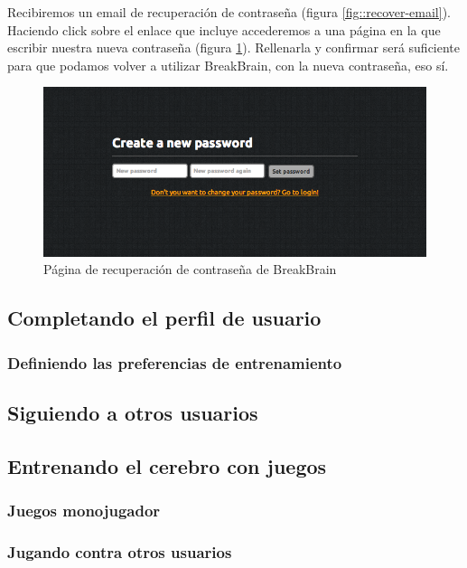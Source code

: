Recibiremos un email de recuperación de contraseña (figura \ref{fig::recover-email}). Haciendo click sobre el enlace que incluye accederemos a una página en la que escribir nuestra nueva contraseña (figura \ref{fig::recover-pass}). Rellenarla y confirmar será suficiente para que podamos volver a utilizar BreakBrain, con la nueva contraseña, eso sí.

\begin{figure}[h]
  \begin{center}
    \includegraphics[width=\textwidth]{./images/page-password.png}
  \end{center}  
  \caption{Página de recuperación de contraseña de BreakBrain}
  \label{fig::recover-pass}
\end{figure}

\subsection{Completando el perfil de usuario}

\subsubsection{Definiendo las preferencias de entrenamiento}

\subsection{Siguiendo a otros usuarios}

\subsection{Entrenando el cerebro con juegos}

\subsubsection{Juegos monojugador}

\subsubsection{Jugando contra otros usuarios}
